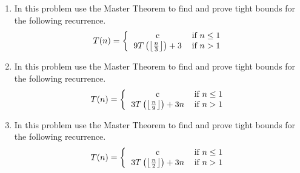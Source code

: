 \documentclass[12pt]{article}
\begin{document}
\begin{enumerate}
\newpage
\item In this problem use the Master Theorem to find and prove tight bounds for the following recurrence.
\[
T(n) = \left\{
\begin{tabular}{cc}
c & \text{if} $n\leq 1$ \\
$9T\left(\left\lfloor\frac{n}{3}\right\rfloor\right)+3$ & \text{if} $n>1$ \\
\end{tabular}\right.
\]
\newpage
\item In this problem use the Master Theorem to find and prove tight bounds for the following recurrence.
\[
T(n) = \left\{
\begin{tabular}{cc}
c & \text{if} $n\leq 1$ \\
$3T\left(\left\lfloor\frac{n}{9}\right\rfloor\right)+3n$ & \text{if} $n>1$ \\
\end{tabular}\right.
\]
\newpage
\item In this problem use the Master Theorem to find and prove tight bounds for the following recurrence.
\[
T(n) = \left\{
\begin{tabular}{cc}
c & \text{if} $n\leq 1$ \\
$3T\left(\left\lfloor\frac{n}{2}\right\rfloor\right)+3n$ & \text{if} $n>1$ \\
\end{tabular}\right.
\]
\end{enumerate} 
\newpage
\end{document}
